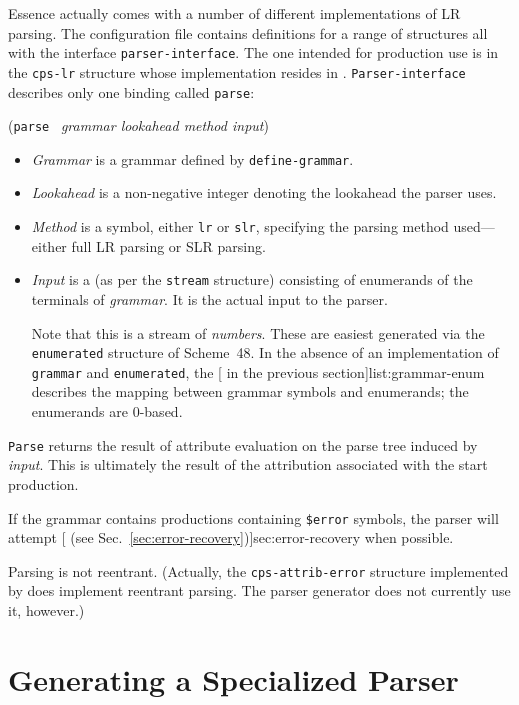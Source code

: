 \documentclass{article}
\renewcommand{\var}[1]{\noindent\mbox{\textit{#1}}}
\newcommand{\ide}[1]{{\frenchspacing\textnormal{\texttt{#1}}}}
\newcommand{\pproto}[2]{\unskip%
\mbox{\texonly{\spaceskip=0.5em}#1}%
\mbox{ }\texonly{\nobreak}\htmlonly{ }\textrm{#2}}
\newcommand{\proto}[3]{\par\bigskip\begin{flushleft}\pproto{(\texttt{#1}}{\textit{#2})}\hspace*{\fill}{#3}\end{flushleft}}
\newcommand{\codefont}[1]{\texttt{#1}}
\begin{document}
Essence actually comes with a number of different implementations of
LR parsing.  The  configuration file contains
definitions for a range of structures all with the interface
\codefont{parser-interface}.  The one intended for production use is in the
\codefont{cps-lr} structure whose implementation resides in
.  \codefont{Parser-interface} describes only 
one binding called \codefont{parse}:

\label{proc:parse}
\proto{parse}{grammar lookahead method input}{procedure}
%
\begin{itemize}
\item \var{Grammar} is a grammar defined by \codefont{define-grammar}.
\item \var{Lookahead} is a non-negative integer denoting the
  lookahead the parser uses.
\item \var{Method} is a symbol, either \codefont{lr} or
  \codefont{slr}, specifying the parsing method used---either full LR
  parsing or SLR parsing.
\item \var{Input} is a  (as per the
  \codefont{stream} structure) consisting of enumerands of the
  terminals of \var{grammar}.  It is the actual input to the parser.
  
  Note that this is a stream of \emph{numbers}.  These are easiest
  generated via the \codefont{enumerated} structure of Scheme~48.  In
  the absence of an implementation of \codefont{grammar} and
  \codefont{enumerated}, the [ in the
  previous section]{list:grammar-enum} describes the mapping between
  grammar symbols and enumerands; the enumerands are 0-based.
\end{itemize}
%
\ide{Parse} returns the result of attribute evaluation on the parse
tree induced by \var{input}.  This is ultimately the result of the
attribution associated with the start production.

If the grammar contains productions containing \codefont{\$error}
symbols, the parser will attempt [ (see
Sec.~\ref{sec:error-recovery})]{sec:error-recovery} when possible.

Parsing is not reentrant.  (Actually, the \codefont{cps-attrib-error}
structure implemented by  does
implement reentrant parsing.  The parser generator does not currently
use it, however.)

\section{Generating a Specialized Parser}
\label{sec:parser-generation}
\end{document}
